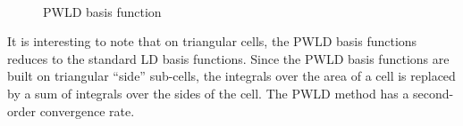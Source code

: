 \begin{figure}[H]
\centering
{}
\\
\caption{PWLD basis function}
\label{pwld}
\end{figure}
It is interesting to note that on triangular cells, the PWLD basis functions
reduces to the standard LD basis functions. Since the PWLD basis functions are
built on triangular ``side'' sub-cells, the integrals over the area of a cell
is replaced by a sum of integrals over the sides of the cell. The PWLD method has 
a second-order convergence rate.

